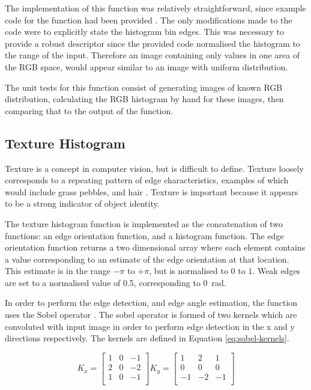 The implementation of this function was relatively straightforward, since example code for the function had been provided \cite{collomosse2016}. The only modifications made to the code were to explicitly state the histogram bin edges. This was necessary to provide a robust descriptor since the provided code normalised the histogram to the range of the input. Therefore an image containing only values in one area of the RGB space, would appear similar to an image with uniform distribution.

The unit tests for this function consist of generating images of known RGB distribution, calculating the RGB histogram by hand for these images, then comparing that to the output of the function.
\subsection{Texture Histogram} \label{sec:texture-histogram}
Texture is a concept in computer vision, but is difficult to define. Texture loosely corresponds to a repeating pattern of edge characteristics, examples of which would include grass pebbles, and hair \cite[p. 194]{forsyth2012}. Texture is important because it appears to be a strong indicator of object identity.

The texture histogram function is implemented as the concatenation of two functions: an edge orientation function, and a histogram function. The edge orientation function returns a two dimensional array where each element contains a value corresponding to an estimate of the edge orientation at that location. This estimate is in the range $-\pi$ to $+\pi$, but is normalised to $0$ to $1$. Weak edges are set to a normalised value of 0.5, corresponding to \SI{0}{\radian}.

In order to perform the edge detection, and edge angle estimation, the function uses the Sobel operator \cite{sobel2015}. The sobel operator is formed of two kernels which are convoluted with input image in order to perform edge detection in the x and y directions respectively. The kernels are defined in Equation \ref{eq:sobel-kernels}. 

\begin{equation}
	K_x = 
	\begin{bmatrix}
	1 & 0 & -1 \\
	2 & 0 & -2 \\
	1 & 0 & -1 \\
	\end{bmatrix}
	K_y = 
	\begin{bmatrix}
	1 & 2 & 1 \\
	0 & 0 & 0 \\
	-1 & -2 & -1 \\
	\end{bmatrix}
	\label{eq:sobel-kernels}
\end{equation}


